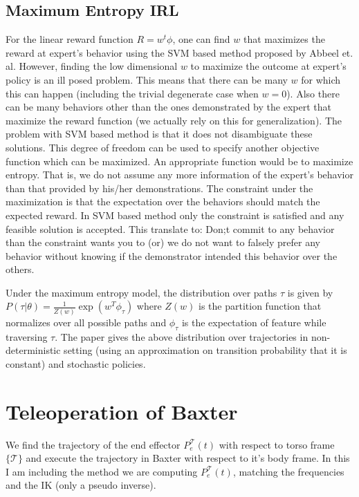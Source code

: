 \documentclass{article}[11pt]
\begin{document}
\subsection{Maximum Entropy IRL \cite{ziebart2008maximum}}
For the linear reward function $R = w^t\phi$, one can find $w$ that maximizes the reward at expert's behavior using the SVM based method proposed by Abbeel et. al. However, finding the low dimensional $w$ to maximize the outcome at expert's policy is an ill posed problem. This means that there can be many $w$ for which this can happen (including the trivial degenerate case when $w = 0$). Also there can be many behaviors other than the ones demonstrated by the expert that maximize the reward function (we actually rely on this for generalization). The problem with SVM based method is that it does not disambiguate these solutions. This degree of freedom can be used to specify another objective function which can be maximized. An appropriate function would be to maximize entropy. That is, we do not assume any more information of the expert's behavior than that provided by his/her demonstrations. The constraint under the maximization is that the expectation over the behaviors should match the expected reward. In SVM based method only the constraint is satisfied and any feasible solution is accepted. This translate to: Don;t commit to any behavior than the constraint wants you to (or) we do not want to falsely prefer any behavior without knowing if the demonstrator intended this behavior over the others. 

Under the maximum entropy model, the distribution over paths $\tau$ is given by $P(\tau|\theta) = \frac{1}{Z(w)}\exp(w^T\phi_\tau)$ where $Z(w)$ is the partition function that normalizes over all possible paths and $\phi_\tau$ is the expectation of feature while traversing $\tau$. The paper gives the above distribution over trajectories  in non-deterministic setting (using an approximation on transition probability that it is constant) and stochastic policies. 

\section{Teleoperation of Baxter}
We find the trajectory of the end effector $P^\mathcal{T}_e(t)$ with respect to torso frame $\{\mathcal{T}\}$ and execute the trajectory in Baxter with respect to it's body frame. In this I am including the method we are computing $P^\mathcal{T}_e(t)$, matching the frequencies and the IK (only a pseudo inverse). 
\end{document}
